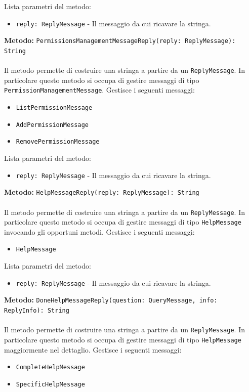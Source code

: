 \documentclass[a4paper]{article}
\begin{document}
			Lista parametri del metodo:
			\begin{itemize}
				\item \texttt{reply: ReplyMessage} - Il messaggio da cui ricavare la stringa.
			\end{itemize}
		\textbf{Metodo: }\texttt{PermissionsManagementMessageReply(reply: ReplyMessage): String}
			\\ \\
			Il metodo permette di costruire una stringa a partire da un \texttt{ReplyMessage}. In particolare questo metodo si occupa di gestire messaggi di tipo \texttt{PermissionManagementMessage}.
			Gestisce i seguenti messaggi:
			\begin{itemize}
				\item \texttt{ListPermissionMessage}
				\item \texttt{AddPermissionMessage}
				\item \texttt{RemovePermissionMessage}
			\end{itemize}
			Lista parametri del metodo:
			\begin{itemize}
				\item \texttt{reply: ReplyMessage} - Il messaggio da cui ricavare la stringa.
			\end{itemize}
		\textbf{Metodo: }\texttt{HelpMessageReply(reply: ReplyMessage): String}
			\\ \\
			Il metodo permette di costruire una stringa a partire da un \texttt{ReplyMessage}. In particolare questo metodo si occupa di gestire messaggi di tipo \texttt{HelpMessage} invocando gli opportuni metodi.
			Gestisce i seguenti messaggi:
			\begin{itemize}
				\item \texttt{HelpMessage}
			\end{itemize}
			Lista parametri del metodo:
			\begin{itemize}
				\item \texttt{reply: ReplyMessage} - Il messaggio da cui ricavare la stringa.
			\end{itemize}
		\textbf{Metodo: }\texttt{DoneHelpMessageReply(question: QueryMessage, info: ReplyInfo): String}
			\\ \\
			Il metodo permette di costruire una stringa a partire da un \texttt{ReplyMessage}. In particolare questo metodo si occupa di gestire messaggi di tipo \texttt{HelpMessage} maggiormente nel dettaglio.
			Gestisce i seguenti messaggi:
			\begin{itemize}
				\item \texttt{CompleteHelpMessage}
				\item \texttt{SpecificHelpMessage}
			\end{itemize}
\end{document}
